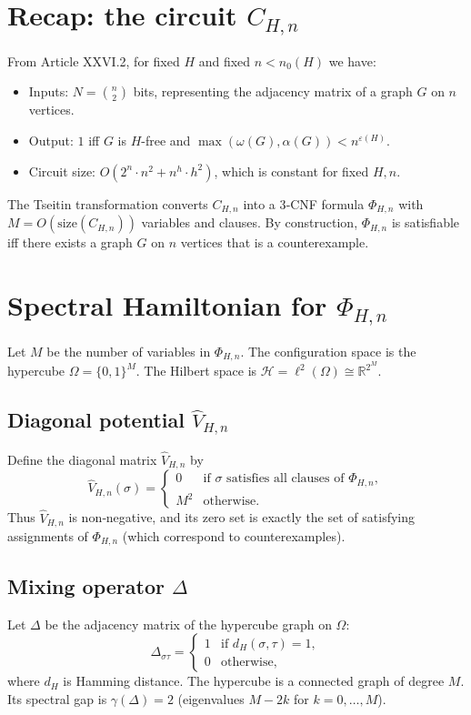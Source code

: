 \documentclass[11pt,a4paper]{article}
\begin{document}
\section{Recap: the circuit $C_{H,n}$}
From Article XXVI.2, for fixed $H$ and fixed $n < n_0(H)$ we have:
\begin{itemize}
\item Inputs: $N = \binom{n}{2}$ bits, representing the adjacency matrix of a graph $G$ on $n$ vertices.
\item Output: $1$ iff $G$ is $H$-free and $\max(\omega(G),\alpha(G)) < n^{\varepsilon(H)}$.
\item Circuit size: $O(2^n \cdot n^2 + n^h \cdot h^2)$, which is constant for fixed $H,n$.
\end{itemize}
The Tseitin transformation converts $C_{H,n}$ into a 3‑CNF formula $\Phi_{H,n}$ with $M = O(\text{size}(C_{H,n}))$ variables and clauses. By construction, $\Phi_{H,n}$ is satisfiable iff there exists a graph $G$ on $n$ vertices that is a counterexample.

\section{Spectral Hamiltonian for $\Phi_{H,n}$}
Let $M$ be the number of variables in $\Phi_{H,n}$. The configuration space is the hypercube $\Omega = \{0,1\}^M$. The Hilbert space is $\mathcal{H} = \ell^2(\Omega) \cong \mathbb{R}^{2^M}$.

\subsection{Diagonal potential $\hat{V}_{H,n}$}
Define the diagonal matrix $\hat{V}_{H,n}$ by
\[
\hat{V}_{H,n}(\sigma) = \begin{cases}
0 & \text{if }\sigma\text{ satisfies all clauses of } \Phi_{H,n},\\
M^2 & \text{otherwise}.
\end{cases}
\]
Thus $\hat{V}_{H,n}$ is non‑negative, and its zero set is exactly the set of satisfying assignments of $\Phi_{H,n}$ (which correspond to counterexamples).

\subsection{Mixing operator $\Delta$}
Let $\Delta$ be the adjacency matrix of the hypercube graph on $\Omega$:
\[
\Delta_{\sigma\tau} = \begin{cases}
1 & \text{if } d_H(\sigma,\tau)=1,\\
0 & \text{otherwise},
\end{cases}
\]
where $d_H$ is Hamming distance. The hypercube is a connected graph of degree $M$. Its spectral gap is $\gamma(\Delta)=2$ (eigenvalues $M-2k$ for $k=0,\dots,M$).
\end{document}

